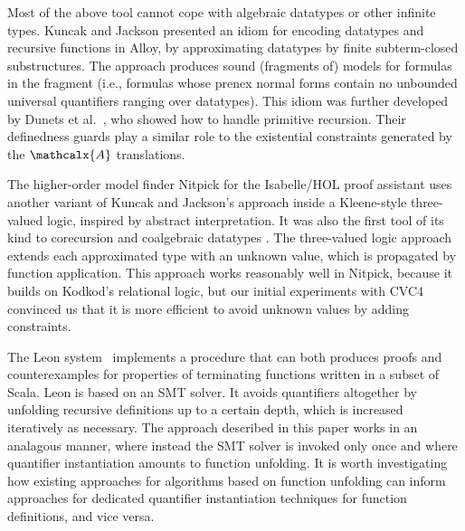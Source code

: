 \documentclass[runningheads,a4paper]{llncs}
\newcommand\cvc{CVC4\xspace}
\newcommand{\conv}{\mathcalx{A}}
\newcommand{\rem}[1]{\textcolor{red}{[#1]}}
\newcommand{\jb}[1]{\rem{#1 --jb}}
\newcommand{\ct}[1]{\rem{#1 --ct}}
\begin{document}
Most of the above tool cannot cope with algebraic datatypes or other infinite
types. Kuncak and Jackson \cite{kuncak-jackson-2005} presented an idiom for
encoding datatypes and recursive functions in Alloy, by approximating datatypes
by finite subterm-closed substructures. The approach produces sound (fragments
of) models for formulas in the  fragment
(i.e., formulas whose prenex normal forms contain no unbounded universal
quantifiers ranging over datatypes). This idiom was further developed by Dunets
et al.\ \cite{dunets-et-al-2010}, who showed how to handle primitive recursion.
Their definedness guards play a similar role to the existential constraints
generated by the $\conv$ translations.

The higher-order model finder Nitpick for the Isabelle/HOL proof assistant uses
another variant of Kuncak and Jackson's approach inside a Kleene-style
three-valued logic, inspired by abstract interpretation. It was also the first
tool of its kind to corecursion and coalgebraic datatypes
\cite{blanchette-2013-relational}. The three-valued logic approach extends each
approximated type with an unknown value, which is propagated by function
application. This approach works reasonably well in Nitpick, because it builds
on Kodkod's relational logic, but our initial experiments with \cvc convinced
us that it is more efficient to avoid unknown values by adding constraints.

The Leon system~\cite{blanc2013overview} implements a procedure that can both
produces proofs and counterexamples for properties of terminating functions
written in a subset of Scala. Leon is based on an SMT solver. It avoids
quantifiers altogether by unfolding recursive definitions up to a certain
depth, which is increased iteratively as necessary.
The approach described in this paper works in an analagous manner, 
where instead the SMT solver is invoked only once 
and where quantifier instantiation amounts to function unfolding.
It is worth investigating how existing approaches for algorithms based on function unfolding
can inform approaches for dedicated quantifier instantiation techniques for function definitions,
and vice versa.
\end{document}
